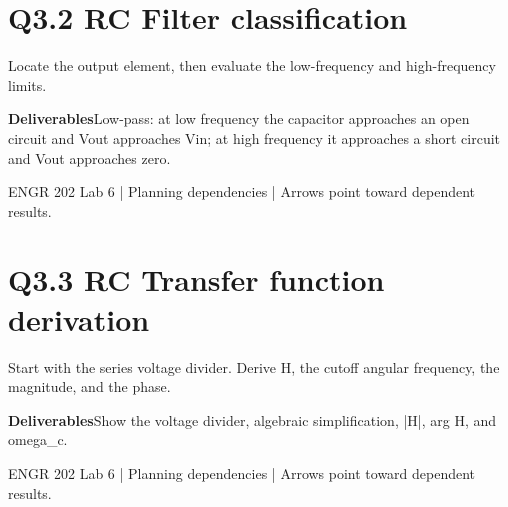 \documentclass[11pt]{article}
\begin{document}
\section*{Q3.2 RC Filter classification}
Locate the output element, then evaluate the low-frequency and high-frequency limits.\par\medskip
\textbf{Deliverables}\quad Low-pass: at low frequency the capacitor approaches an open circuit and Vout approaches Vin; at high frequency it approaches a short circuit and Vout approaches zero.\par\bigskip
\begin{center}\end{center}
\vfill\small ENGR 202 Lab 6 | Planning dependencies | Arrows point toward dependent results.
\newpage
\section*{Q3.3 RC Transfer function derivation}
Start with the series voltage divider. Derive H, the cutoff angular frequency, the magnitude, and the phase.\par\medskip
\textbf{Deliverables}\quad Show the voltage divider, algebraic simplification, |H|, arg H, and omega\_c.\par\bigskip
\begin{center}\end{center}
\vfill\small ENGR 202 Lab 6 | Planning dependencies | Arrows point toward dependent results.
\newpage
\end{document}
